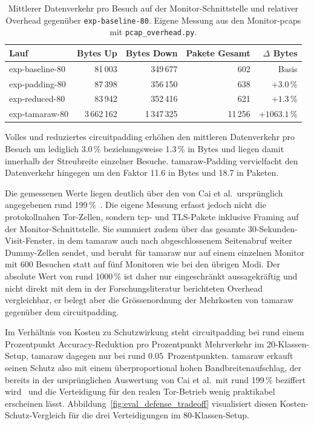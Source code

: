 \begin{table}[h]
    \centering
    \caption{Mittlerer Datenverkehr pro Besuch auf der Monitor-Schnittstelle und relativer Overhead gegenüber \texttt{exp-baseline-80}. Eigene Messung aus den Monitor-\glspl{pcap} mit \texttt{pcap\_overhead.py}.}
    \label{tab:eval_bandwidth}
    \begin{tabular}{lrrrr}
        \hline
        Lauf & Bytes Up & Bytes Down & Pakete Gesamt & $\Delta$ Bytes \\
        \hline
        exp-baseline-80 &      81\,003 &     349\,677 &       602 & Basis \\
        exp-padding-80  &      87\,398 &     356\,150 &       638 & $+3.0\,\%$ \\
        exp-reduced-80  &      83\,942 &     352\,416 &       621 & $+1.3\,\%$ \\
        exp-tamaraw-80  & 3\,662\,162 & 1\,347\,325 &  11\,256 & $+1063.1\,\%$ \\
        \hline
    \end{tabular}
\end{table}

Volles und reduziertes \gls{circuitpadding} erhöhen den mittleren Datenverkehr pro Besuch um lediglich 3.0\,\% beziehungsweise 1.3\,\% in Bytes und liegen damit innerhalb der Streubreite einzelner Besuche.
\gls{tamaraw}-Padding vervielfacht den Datenverkehr hingegen um den Faktor 11.6 in Bytes und 18.7 in Paketen.

Die gemessenen Werte liegen deutlich über den von Cai et al.\ ursprünglich angegebenen rund 199\,\%~\cite{cai2014systematic}.
Die eigene Messung erfasst jedoch nicht die protokollnahen Tor-Zellen, sondern \gls{tcp}- und TLS-Pakete inklusive Framing auf der Monitor-Schnittstelle.
Sie summiert zudem über das gesamte 30-Sekunden-Visit-Fenster, in dem \gls{tamaraw} auch nach abgeschlossenem Seitenabruf weiter Dummy-Zellen sendet, und beruht für \gls{tamaraw} nur auf einem einzelnen Monitor mit 600 Besuchen statt auf fünf Monitoren wie bei den übrigen Modi.
Der absolute Wert von rund 1000\,\% ist daher nur eingeschränkt aussagekräftig und nicht direkt mit dem in der Forschungsliteratur berichteten Overhead vergleichbar, er belegt aber die Grössenordnung der Mehrkosten von \gls{tamaraw} gegenüber dem \gls{circuitpadding}.

Im Verhältnis von Kosten zu Schutzwirkung steht \gls{circuitpadding} bei rund einem Prozentpunkt Accuracy-Reduktion pro Prozentpunkt Mehrverkehr im 20-Klassen-Setup, \gls{tamaraw} dagegen nur bei rund 0.05~Prozentpunkten.
\gls{tamaraw} erkauft seinen Schutz also mit einem überproportional hohen Bandbreitenaufschlag, der bereits in der ursprünglichen Auswertung von Cai et al.\ mit rund 199\,\% beziffert wird~\cite{cai2014systematic} und die Verteidigung für den realen Tor-Betrieb wenig praktikabel erscheinen lässt.
Abbildung~\ref{fig:eval_defense_tradeoff} visualisiert diesen Kosten-Schutz-Vergleich für die drei Verteidigungen im 80-Klassen-Setup.

